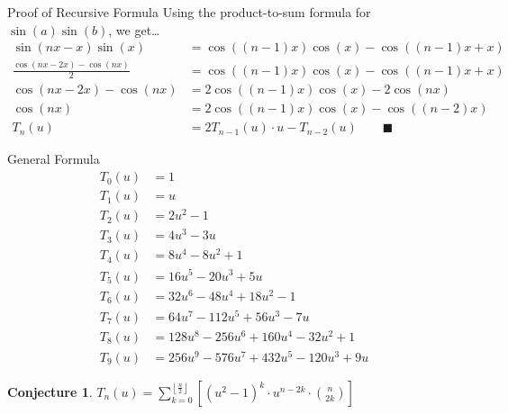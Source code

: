 \documentclass{beamer}
\newtheorem{conjecture}{Conjecture}
\begin{document}
\begin{frame}{Proof of Recursive Formula}
 Using the product-to-sum formula for $\sin(a)\sin(b)$, we get\dots
 \begin{align*}
  \sin(nx-x)\sin(x)               & =\cos((n-1)x)\cos(x) - \cos ((n-1)x+x)                     \\[12pt]
  \frac{\cos(nx-2x) -\cos(nx)}{2} & =\cos((n-1)x)\cos(x) - \cos ((n-1)x+x)                     \\[12pt]
  \cos(nx-2x) -\cos(nx)           & = 2\cos((n-1)x)\cos(x) - 2\cos (nx)                        \\[12pt]
  \cos(nx)                        & = 2\cos((n-1)x)\cos(x) - \cos((n-2)x)                      \\[12pt]
  T_n(u)                          & = 2T_{n-1}(u)\cdot u - T_{n-2}(u)      \qquad \blacksquare
 \end{align*}
\end{frame}


\begin{frame}{General Formula}
 \vspace{-18pt}
 \tiny{}
 \begin{align*}
  T_0(u) & = 1                                      \\
  T_1(u) & = u                                      \\
  T_2(u) & = 2u^2 - 1                               \\
  T_3(u) & = 4u^3 - 3u                              \\
  T_4(u) & = 8u^4 - 8 u^2 + 1                       \\
  T_5(u) & = 16u^5 - 20u^3 + 5u                     \\
  T_6(u) & = 32u^6 - 48u^4 + 18u^2 - 1              \\
  T_7(u) & = 64u^7 - 112u^5 + 56u^3 - 7u            \\
  T_8(u) & = 128u^8 - 256u^6 + 160u^4 - 32u^2 + 1   \\
  T_9(u) & = 256u^9 - 576u^7 + 432u^5 - 120u^3 + 9u
 \end{align*} \normalsize
 \hline
 \vspace{12pt}
 \begin{conjecture}\center
  \vspace{-12pt}
  $T_n(u) = \displaystyle\sum_{k=0}^{\left\lfloor \tfrac{n}{2} \right\rfloor} \left[(u^2-1)^k \cdot u^{n-2k} \cdot \binom{n}{2k}\right]$
 \end{conjecture}
\end{frame}
\end{document}
